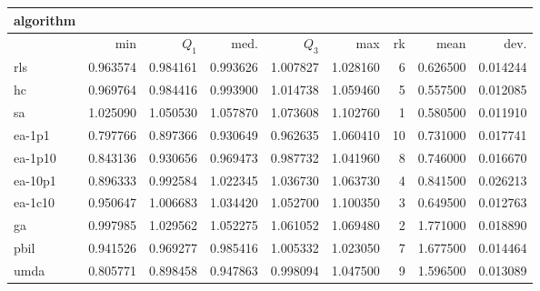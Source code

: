 \begin{tabular}{@{}l*{5}{>{{}}N{1}{2}}>{{}}N{2}{0}N{1}{3}N{1}{3}@{}}
\toprule
{algorithm} &  &  \\
\midrule
& {min} & {$Q_1$} & {med.} & {$Q_3$} & {max} & {rk} & {mean} & {dev.} \\
\midrule
rls & 0.963574 & 0.984161 & 0.993626 & 1.007827 & 1.028160 & 6 & 0.626500 & 0.014244 \\
 hc & 0.969764 & 0.984416 & 0.993900 & 1.014738 & 1.059460 & 5 & 0.557500 & 0.012085 \\
 sa & {\color{blue}} 1.025090 & {\color{blue}} 1.050530 & {\color{blue}} 1.057870 & {\color{blue}} 1.073608 & {\color{blue}} 1.102760 & 1 & 0.580500 & 0.011910 \\
 ea-1p1 & 0.797766 & 0.897366 & 0.930649 & 0.962635 & 1.060410 & 10 & 0.731000 & 0.017741 \\
 ea-1p10 & 0.843136 & 0.930656 & 0.969473 & 0.987732 & 1.041960 & 8 & 0.746000 & 0.016670 \\
 ea-10p1 & 0.896333 & 0.992584 & 1.022345 & 1.036730 & 1.063730 & 4 & 0.841500 & 0.026213 \\
 ea-1c10 & 0.950647 & 1.006683 & 1.034420 & 1.052700 & 1.100350 & 3 & 0.649500 & 0.012763 \\
 ga & 0.997985 & 1.029562 & 1.052275 & 1.061052 & 1.069480 & 2 & 1.771000 & 0.018890 \\
 pbil & 0.941526 & 0.969277 & 0.985416 & 1.005332 & 1.023050 & 7 & 1.677500 & 0.014464 \\
 umda & 0.805771 & 0.898458 & 0.947863 & 0.998094 & 1.047500 & 9 & 1.596500 & 0.013089 \\
 \bottomrule
\end{tabular}

